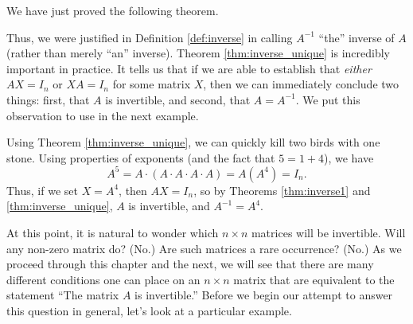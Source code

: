 We have just proved the following theorem.

\smallskip


\smallskip


Thus, we were justified in Definition \ref{def:inverse} in calling $A^{-1}$ ``the'' inverse of $A$ (rather than merely ``an'' inverse). Theorem \ref{thm:inverse_unique} is incredibly important in practice. It tells us that if we are able to establish that \textit{either} $AX=I_n$ or $XA = I_n$ for some matrix $X$, then we can immediately conclude two things: first, that $A$ is invertible, and second, that $A=A^{-1}$. We put this observation to use in the next example.

\medskip

{Using Theorem \ref{thm:inverse_unique}, we can quickly kill two birds with one stone. Using properties of exponents (and the fact that $5=1+4$), we have
\[
A^5 = A\cdot (A\cdot A\cdot A\cdot A) = A(A^4) = I_n.
\]
Thus, if we set $X=A^4$, then $AX = I_n$, so by Theorems \ref{thm:inverse1} and \ref{thm:inverse_unique}, $A$ is invertible, and $A^{-1} = A^4$.}

\medskip

At this point, it is natural to wonder which $n\times n$ matrices will be invertible. Will any non-zero matrix do? (No.) Are such matrices a rare occurrence? (No.) As we proceed through this chapter and the next, we will see that there are many different conditions one can place on an $n\times n$ matrix that are equivalent to the statement ``The matrix $A$ is invertible.'' Before we begin our attempt to answer this question in general, let's look at a particular example.

